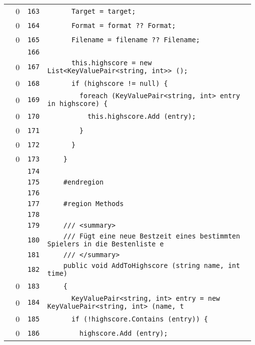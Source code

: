 \documentclass[a4paper,10pt]{article}
\begin{document}
\begin{longtable}[l]{lrrl}
\cellcolor{red} & 0 & \verb~163~ & \verb~      Target = target;~\\
\cellcolor{red} & 0 & \verb~164~ & \verb~      Format = format ?? Format;~\\
\cellcolor{red} & 0 & \verb~165~ & \verb~      Filename = filename ?? Filename;~\\
\cellcolor{gray} &  & \verb~166~ & \verb~~\\
\cellcolor{red} & 0 & \verb~167~ & \verb~      this.highscore = new List<KeyValuePair<string, int>> ();~\\
\cellcolor{red} & 0 & \verb~168~ & \verb~      if (highscore != null) {~\\
\cellcolor{red} & 0 & \verb~169~ & \verb~        foreach (KeyValuePair<string, int> entry in highscore) {~\\
\cellcolor{red} & 0 & \verb~170~ & \verb~          this.highscore.Add (entry);~\\
\cellcolor{red} & 0 & \verb~171~ & \verb~        }~\\
\cellcolor{red} & 0 & \verb~172~ & \verb~      }~\\
\cellcolor{red} & 0 & \verb~173~ & \verb~    }~\\
\cellcolor{gray} &  & \verb~174~ & \verb~~\\
\cellcolor{gray} &  & \verb~175~ & \verb~    #endregion~\\
\cellcolor{gray} &  & \verb~176~ & \verb~~\\
\cellcolor{gray} &  & \verb~177~ & \verb~    #region Methods~\\
\cellcolor{gray} &  & \verb~178~ & \verb~~\\
\cellcolor{gray} &  & \verb~179~ & \verb~    /// <summary>~\\
\cellcolor{gray} &  & \verb~180~ & \verb~    /// Fügt eine neue Bestzeit eines bestimmten Spielers in die Bestenliste e~\\
\cellcolor{gray} &  & \verb~181~ & \verb~    /// </summary>~\\
\cellcolor{gray} &  & \verb~182~ & \verb~    public void AddToHighscore (string name, int time)~\\
\cellcolor{red} & 0 & \verb~183~ & \verb~    {~\\
\cellcolor{red} & 0 & \verb~184~ & \verb~      KeyValuePair<string, int> entry = new KeyValuePair<string, int> (name, t~\\
\cellcolor{red} & 0 & \verb~185~ & \verb~      if (!highscore.Contains (entry)) {~\\
\cellcolor{red} & 0 & \verb~186~ & \verb~        highscore.Add (entry);~\\

\end{longtable}
\end{document}
